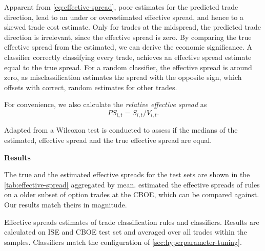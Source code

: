 Apparent from \cref{eq:effective-spread}, poor estimates for the predicted trade direction, lead to an under or overestimated effective spread, and hence to a skewed trade cost estimate. Only for trades at the midspread, the predicted trade direction is irrelevant, since the effective spread is zero. By comparing the true effective spread from the estimated, we can derive the economic significance. A classifier correctly classifying every trade, achieves an effective spread estimate equal to the true spread. For a random classifier, the effective spread is around zero, as misclassification estimates the spread with the opposite sign, which offsets with correct, random estimates for other trades.

For convenience, we also calculate the \emph{relative effective spread} as
\begin{equation}
    {PS}_{i,t} = S_{i,t} / V_{i,t}.
\end{equation}

Adapted from \textcite[][12]{theissenTestAccuracyLee2000} a Wilcoxon test is conducted to assess if the medians of the estimated, effective spread and the true effective spread are equal.

\textbf{Results}

The true and the estimated effective spreads for the test sets are shown in the \cref{tab:effective-spread} aggregated by mean. \textcite[][896--897]{savickasInferringDirectionOption2003} estimated the effective spreads of rules on a older subset of option trades at the \gls{CBOE}, which can be compared against. Our results match theirs in magnitude.

\begin{table}[!ht]
    \centering
    
    \caption[Effective Spreads Estimates of Trade Classification Rules and Classifiers]{Effective spreads estimates of trade classification rules and classifiers. Results are calculated on \gls{ISE} and \gls{CBOE} test set and averaged over all trades within the samples. Classifiers match the configuration of \cref{sec:hyperparameter-tuning}.}
    \label{tab:effective-spread}
\end{table}

